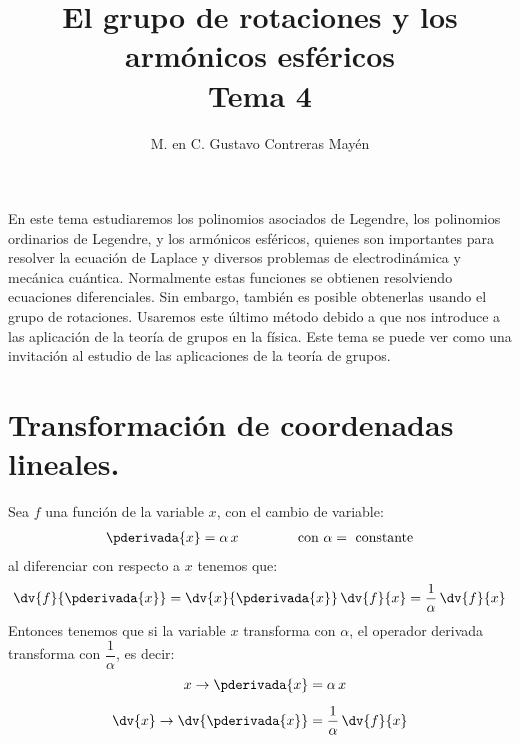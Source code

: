 

\title{El grupo de rotaciones y los armónicos esféricos \\ {\large Tema 4}\vspace{-3ex}}
\author{M. en C. Gustavo Contreras Mayén}
\date{ }

\pagestyle{fancy}
\fancyhf{}
\lhead{\leftmark}
\rfoot{\thepage}
\setlength{\headheight}{16pt}%

\def\changemargin#1#2{\list{}{\rightmargin#2\leftmargin#1}\item[]}
\let\endchangemargin=\endlist 



\maketitle
\fontsize{14}{14}\selectfont
\tableofcontents
\newpage


En este tema estudiaremos los polinomios asociados de Legendre, los polinomios ordinarios de Legendre, y los armónicos esféricos, quienes son importantes para resolver la ecuación de Laplace y diversos problemas de electrodinámica y mecánica cuántica. Normalmente estas funciones se obtienen resolviendo ecuaciones diferenciales. Sin embargo, también es posible obtenerlas usando el grupo de rotaciones. Usaremos este último método debido a que nos introduce a las aplicación de la teoría de grupos en la física. Este tema se puede ver como una invitación al estudio de las aplicaciones de la teoría de grupos.

\section{Transformación de coordenadas lineales.}

Sea $f$ una función de la variable $x$, con el cambio de variable:
\begin{align}
\pderivada{x} = \alpha \, x \hspace{1.5cm} \mbox{con } \alpha = \mbox{ constante}
\label{eq:ecuacion_10_001}
\end{align}
al diferenciar con respecto a $x$ tenemos que:
\begin{align}
\dv{f}{\pderivada{x}} = \dv{x}{\pderivada{x}} \, \dv{f}{x} = \dfrac{1}{\alpha} \, \dv{f}{x}
\label{eq:ecuacion_10_002}   
\end{align}
Entonces tenemos que si la variable $x$ transforma con $\alpha$, el operador derivada transforma con $\dfrac{1}{\alpha}$, es decir:
\begin{align}
\begin{aligned}
x \rightarrow \pderivada{x} &= \alpha \, x \\[0.5em]
\dv{x} \rightarrow \dv{\pderivada{x}} &= \dfrac{1}{\alpha} \, \dv{f}{x}
\end{aligned}
\label{eq:ecuacion_10_003}
\end{align}

